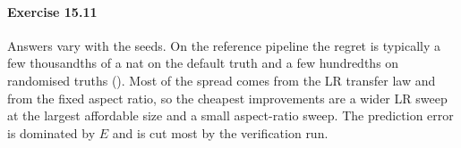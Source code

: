 \paragraph{Exercise 15.11} Answers vary with the seeds. On the reference pipeline the regret is
typically a few thousandths of a nat on the default truth and a few hundredths on randomised
truths (). Most of the spread comes from the LR transfer law and from the
fixed aspect ratio, so the cheapest improvements are a wider LR sweep at the largest affordable
size and a small aspect-ratio sweep. The prediction error is dominated by $E$ and is cut most by
the verification run.
